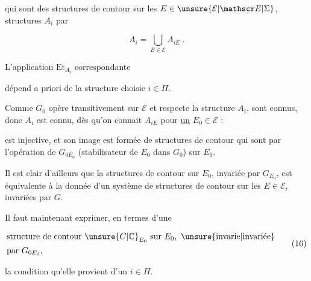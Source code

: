 
qui sont des structures de contour sur les
$E\in\unsure{\mathcal E|\mathscr E|\Sigma}$,  structures  $A_i$ par

\[
 A_i=\bigcup_{E\in\mathcal E}A_{iE}\ . \tag*{(13)}
\]

L'application $\mathrm{Et}_{A_i}$ correspondante


dépend a priori de la  structure choisie $i\in\Pi$.

 Comme $G_0$ opère transitivement sur
$\mathcal E$ et respecte la structure $A_i$,  sont connus,
donc $A_i$ est connu, dès qu'on connait
$A_{iE}$ pour \uline{un} $E_0\in\mathcal E$ :


est injective, et son image est formée
de structures de contour qui sont
 par l'opération de $G_{0E_0}$ (stabilisateur
de $E_0$ dans $G_0$) sur $E_0$.

Il est clair d'ailleurs que la  structures
de contour sur $E_0$, invariée par $G_{E_0}$, est équivalente
à la donnée d'un système  de structures
de contour sur les $E\in\mathcal E$, invariées par $G$.

Il faut maintenant exprimer, en termes
 d'une

\[
 \begin{aligned}
 &\text{structure de contour }\unsure{C|{\mathbb C}}_{E_0}\text{ sur }E_0,\text{ \unsure{invarie|invariée}}\\
 &\text{par }G_{0E_0},
 \end{aligned} \tag*{(16)}
\]

la condition qu'elle provient d'un $i\in\Pi$.

